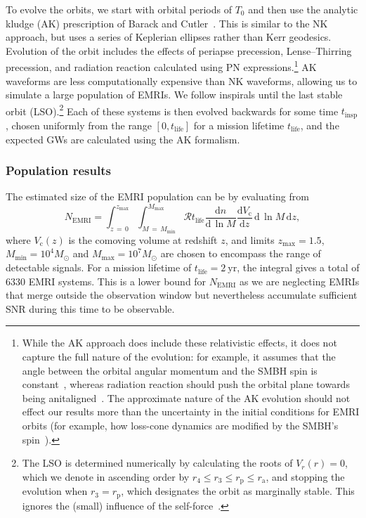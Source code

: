 \documentclass[aps,prd,amsfonts,amssymb,amsmath,nofootinbib,showpacs,superscriptaddress,twocolumn,floatfix]{revtex4-1}
\newcommand{\units}[1]{\ensuremath{~\mathrm{#1}}}
\newcommand{\sub}[1]{\ensuremath{_\mathrm{#1}}}
\newcommand{\dd}{\ensuremath{\mathrm{d}}}
\newcommand{\diff}[2]{\ensuremath{\dfrac{\dd {#1}}{\dd {#2}}}}
\newcommand{\intd}[4]{\ensuremath{\int_{#1}^{#2}{#3}\,\dd{#4}}}
\begin{document}
To evolve the orbits, we start with orbital periods of $T_0$ and then use the analytic kludge (AK) prescription of Barack and Cutler~\cite{Barack2004}. This is similar to the NK approach, but uses a series of Keplerian ellipses rather than Kerr geodesics. Evolution of the orbit includes the effects of periapse precession, Lense--Thirring
precession, and radiation reaction calculated using PN expressions.\footnote{While the AK approach does include these relativistic effects, it does not capture the full nature of the evolution: for example, it assumes that the angle between the orbital angular momentum and the SMBH spin is constant~\cite{Barack2004}, whereas radiation reaction should push the orbital plane towards being anitaligned~\cite{Flanagan2007}. The approximate nature of the AK evolution should not effect our results more than the uncertainty in the initial conditions for EMRI orbits (for example, how loss-cone dynamics are modified by the SMBH's spin~\cite{Amaro-Seoane2012b}).} AK waveforms are less computationally expensive than NK waveforms, allowing us to simulate a large population of EMRIs. We follow inspirals until the last stable orbit (LSO).\footnote{The LSO is determined numerically by calculating the roots of $V_r(r) = 0$, which we denote in ascending order by $r_4 \leq r_3 \leq r\sub{p} \leq r\sub{a}$, and stopping the evolution when $r_3 = r\sub{p}$, which designates the orbit as marginally stable. This ignores the (small) influence of the self-force~\cite{Isoyama2014}.} Each of these systems is then evolved backwards for some time $t\sub{insp}$, chosen uniformly from the range $[0,t\sub{life}]$ for a mission lifetime $t\sub{life}$, and the expected GWs are calculated using the AK formalism.

\subsubsection{Population results}

The estimated size of the EMRI population can be by evaluating from~\cite{Gair2009}
\begin{equation}
\label{eq:EMRI-number}
N\sub{EMRI} = \intd{z\,=\,0}{z\sub{max}}{ \intd{M\,=\,M\sub{min}}{M\sub{max}}{\mathcal{R}t\sub{life}\diff{n}{\,\ln M} \diff{V\sub{c}}{z}}{\,\ln M}}{z},
\end{equation}
where $V\sub{c}(z)$ is the comoving volume at redshift $z$, and limits $z\sub{max} = 1.5$, $M\sub{min} = 10^4 M_\odot$ and $M\sub{max} = 10^7 M_\odot$ are chosen to encompass the range of detectable signals. For a mission lifetime of $t\sub{life} = 2\units{yr}$, the integral gives a total of $6330$ EMRI systems. This is a lower bound for $N\sub{EMRI}$ as we are neglecting EMRIs that merge outside the observation window but nevertheless accumulate sufficient SNR during this time to be observable.
\end{document}
